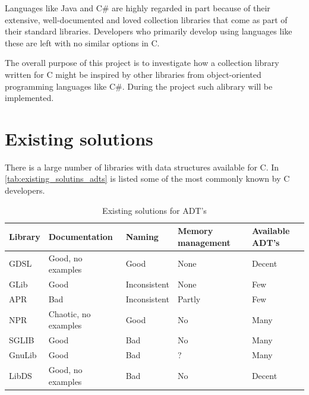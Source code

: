 \documentclass[table]{ituthesis}
\begin{document}
Languages like Java and C\# are highly regarded in part because of their extensive, well-documented and loved collection libraries that come as part of their standard libraries. Developers who primarily develop using languages like these are left with no similar options in C.

The overall purpose of this project is to investigate how a collection library written for C might be inspired by other libraries from object-oriented programming languages like C\#. During the project such alibrary will be implemented.

\section{Existing solutions}\label{sec:existing_solutions}
There is a large number of libraries with data structures available for C. In \autoref{tab:existing_solutins_adts} is listed some of the most commonly known by C developers.

\begin{table}
	\begin{center}
	    \begin{tabular}{ | l | p{3cm} | l | p{2.5cm} | p{2.5cm} |}
			\hline
			\rowcolor{gray!50}
		    \textbf{Library} & \textbf{Documentation}        & \textbf{Naming}       & \textbf{Memory management} & \textbf{Available ADT's} \\ \hline
		    GDSL    & Good, no examples    & Good         & None              & Decent          \\ \hline
		    GLib    & Good                 & Inconsistent & None              & Few             \\ \hline
		    APR     & Bad                  & Inconsistent & Partly            & Few             \\ \hline
		    NPR     & Chaotic, no examples & Good         & No                & Many            \\ \hline
		    SGLIB   & Good                 & Bad          & No                & Many            \\ \hline
		    GnuLib  & Good                 & Bad          & ?                 & Many            \\ \hline
		    LibDS   & Good, no examples    & Bad          & No                & Decent          \\ \hline
	    \end{tabular}
	\end{center}
	\caption{Existing solutions for ADT's}
	\label{tab:existing_solutins_adts}
\end{table}
\end{document}
